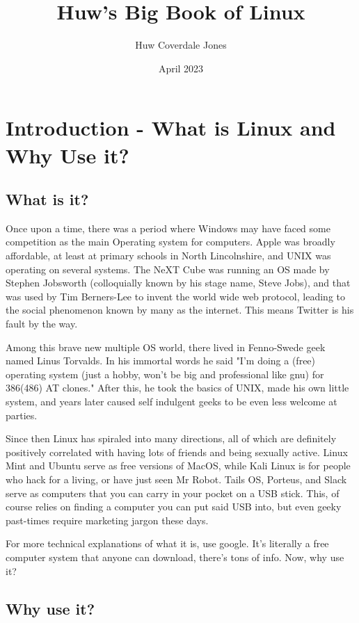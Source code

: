 \documentclass{book}
\title{Huw's Big Book of Linux}
\author{Huw Coverdale Jones}
\date{April 2023}
\begin{document}
\maketitle

\tableofcontents
\printglossaries

\chapter{Introduction - What is
Linux and Why Use it?}

\section{What is it?}
Once upon a time, there was a period where Windows may have faced some competition as the main Operating system for computers. Apple was broadly affordable, at least at primary schools in North Lincolnshire, and UNIX was operating on several systems. The NeXT Cube was running an OS made by Stephen Jobsworth (colloquially known by his stage name, Steve Jobs), and that was used by Tim Berners-Lee to invent the world wide web protocol, leading to the social phenomenon known by many as the internet. This means Twitter is his fault by the way.

Among this brave new multiple OS world, there lived in Fenno-Swede geek named Linus Torvalds. In his immortal words he said "I'm doing a (free) operating system (just a hobby, won't be big and professional like gnu) for 386(486) AT clones." After this, he took the basics of UNIX, made his own little system, and years later caused self indulgent geeks to be even less welcome at parties. 

Since then Linux has spiraled into many directions, all of which are definitely positively correlated with having lots of friends and being sexually active. Linux Mint and Ubuntu serve as free versions of MacOS, while Kali Linux is for people who hack for a living, or have just seen Mr Robot. Tails OS, Porteus, and Slack serve as computers that you can carry in your pocket on a USB stick. This, of course relies on finding a computer you can put said USB into, but even geeky past-times require marketing jargon these days.

For more technical explanations of what it is, use google. It's literally a free computer system that anyone can download, there's tons of info. Now, why use it?

\section{Why use it?}
\end{document}

